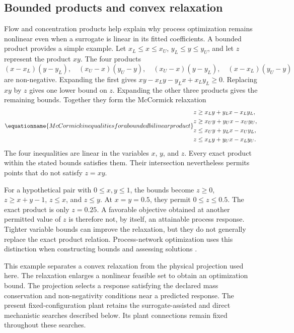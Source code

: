 \subsection{Bounded products and convex relaxation}

Flow and concentration products help explain why process optimization remains nonlinear even when a surrogate is linear in its fitted coefficients. A bounded product provides a simple example. Let $x_L\leq x\leq x_U$, $y_L\leq y\leq y_U$, and let $z$ represent the product $xy$. The four products
\[
(x-x_L)(y-y_L),\quad (x_U-x)(y_U-y),\quad
(x_U-x)(y-y_L),\quad (x-x_L)(y_U-y)
\]
are non-negative. Expanding the first gives $xy-x_Ly-y_Lx+x_Ly_L\geq0$. Replacing $xy$ by $z$ gives one lower bound on $z$. Expanding the other three products gives the remaining bounds. Together they form the McCormick relaxation \citep{McCormick1976}
\begin{equation}
\equationname{McCormick inequalities for a bounded bilinear product}
\begin{aligned}
z&\geq x_Ly+y_Lx-x_Ly_L,\\
z&\geq x_Uy+y_Ux-x_Uy_U,\\
z&\leq x_Uy+y_Lx-x_Uy_L,\\
z&\leq x_Ly+y_Ux-x_Ly_U.
\end{aligned}
\label{eq:teaching_mccormick_relaxation}
\end{equation}
The four inequalities are linear in the variables $x$, $y$, and $z$. Every exact product within the stated bounds satisfies them. Their intersection nevertheless permits points that do not satisfy $z=xy$.

For a hypothetical pair with $0\leq x,y\leq1$, the bounds become $z\geq0$, $z\geq x+y-1$, $z\leq x$, and $z\leq y$. At $x=y=0.5$, they permit $0\leq z\leq0.5$. The exact product is only $z=0.25$. A favorable objective obtained at another permitted value of $z$ is therefore not, by itself, an attainable process response. Tighter variable bounds can improve the relaxation, but they do not generally replace the exact product relation. Process-network optimization uses this distinction when constructing bounds and assessing solutions \citep{RubioCastro2013,YangNetwork2014}.

This example separates a convex relaxation from the physical projection used here. The relaxation enlarges a nonlinear feasible set to obtain an optimization bound. The projection selects a response satisfying the declared mass conservation and non-negativity conditions near a predicted response. The present fixed-configuration plant retains the surrogate-assisted and direct mechanistic searches described below. Its plant connections remain fixed throughout these searches.

